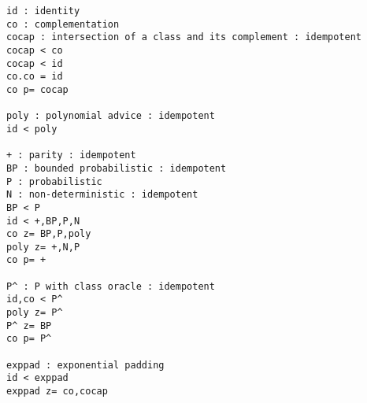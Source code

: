 \begin{verbatim}
id : identity
co : complementation
cocap : intersection of a class and its complement : idempotent
cocap < co
cocap < id
co.co = id
co p= cocap

poly : polynomial advice : idempotent
id < poly

+ : parity : idempotent
BP : bounded probabilistic : idempotent
P : probabilistic
N : non-deterministic : idempotent
BP < P
id < +,BP,P,N
co z= BP,P,poly
poly z= +,N,P
co p= +

P^ : P with class oracle : idempotent
id,co < P^
poly z= P^
P^ z= BP
co p= P^

exppad : exponential padding
id < exppad
exppad z= co,cocap
\end{verbatim}